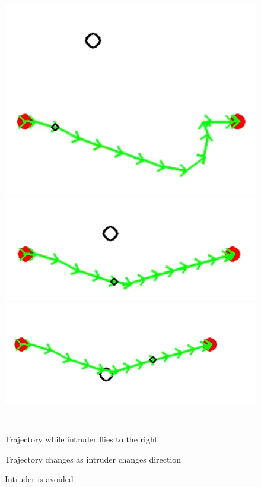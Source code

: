 \begin{figure}[!htb]
    \centering
    \begin{minipage}[b]{.3\linewidth}
        \centering
        \includegraphics[width=0.8\linewidth]{Figures/07_simulation/nonCoop12/nonCoop11.png}
    \end{minipage}%
    \hfill%
    \begin{minipage}[b]{.3\linewidth}
        \centering
        \includegraphics[width=0.8\linewidth]{Figures/07_simulation/nonCoop12/nonCoop12.png}
    \end{minipage}%
    \hfill%
    \begin{minipage}[b]{.3\linewidth}
        \centering
        \includegraphics[width=0.8\linewidth]{Figures/07_simulation/nonCoop12/nonCoop13.png}
    \end{minipage}\\[-7pt]
    \begin{minipage}[t]{.3\linewidth}
        \caption{Trajectory while intruder flies to the right}
        \label{nonCoop11}
    \end{minipage}%
    \hfill%
    \begin{minipage}[t]{.3\linewidth}
        \caption{Trajectory changes as intruder changes direction}
        \label{nonCoop12}
    \end{minipage}%
    \hfill%
    \begin{minipage}[t]{.3\linewidth}
        \caption{Intruder is avoided}
        \label{nonCoop13}
    \end{minipage}%
\end{figure}

